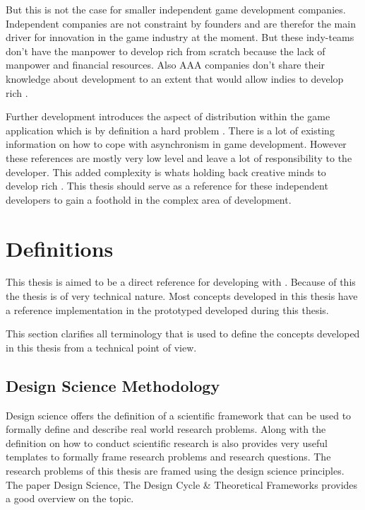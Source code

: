 But this is not the case for smaller independent game development companies.
Independent companies are not constraint by founders and are therefor the main
driver for innovation in the game industry at the moment. But these  indy-teams don't
have the manpower to develop rich \ogs{} from scratch because the lack of
manpower and financial resources. Also AAA companies don't share their knowledge
about \og{} development to an extent that would allow indies to develop rich
\ogs{}.

Further \og{} development introduces the aspect of distribution within the game
application which is by definition a hard problem . There
is a lot of existing information on how to cope with asynchronism in game
development. However these references are mostly very low
level and leave a lot of responsibility to the developer. This added complexity
is whats holding back creative minds to develop rich \ogs{}. This thesis should
serve as a reference for these independent developers to gain a foothold in the
complex area of \og{} development.

\section{Definitions}

This thesis is aimed to be a direct reference for developing \ogs{} with \mss{}.
Because of this the thesis is of very technical nature. Most concepts developed
in this thesis have a reference implementation in the prototyped developed
during this thesis. 

This section clarifies all terminology that is used to define the concepts
developed in this thesis from a technical point of view.

\subsection{Design Science Methodology}

Design science offers the definition of a scientific framework that can be used
to formally define and describe real world research problems. Along with the
definition on how to conduct scientific research is also provides very useful
templates to formally frame research problems and research questions. The
research problems of this thesis are framed using the design science principles.
The paper Design Science, The Design Cycle \& Theoretical Frameworks
\cite{biedermann2016design_science} provides a good overview on the topic.


